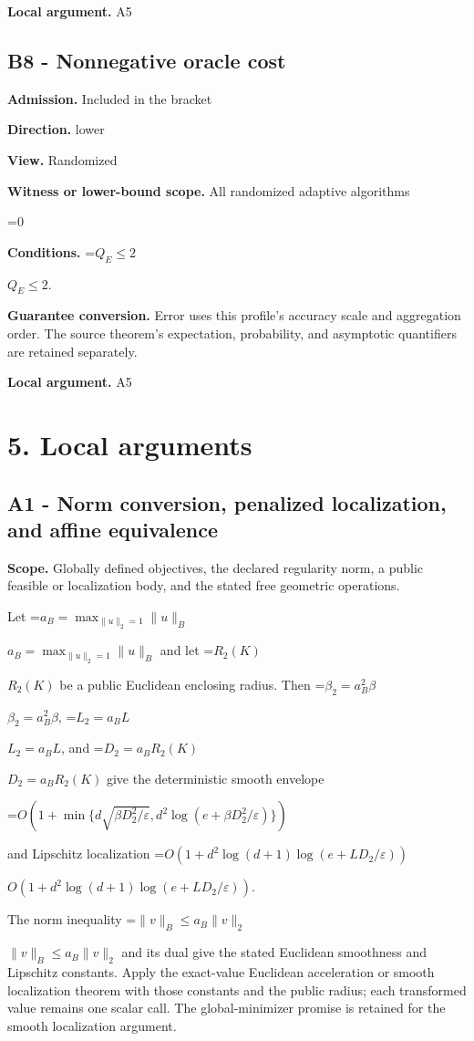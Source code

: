 \documentclass[10pt,a4paper]{article}
\newcommand{\AtlasMath}[1]{\par\begingroup\centering\setbox0=\hbox{$\displaystyle #1$}\ifdim\wd0>1.4\linewidth\typeout{ATLAS WIDE FORMULA: \the\wd0}\fi\ifdim\wd0>\linewidth\resizebox{\linewidth}{!}{\box0}\else\box0\fi\par\endgroup}
\newcommand{\AtlasInlineMath}[1]{\begingroup\setbox0=\hbox{$#1$}\ifdim\wd0>.4\linewidth\endgroup\AtlasMath{#1}\else\endgroup$#1$\fi}
\begin{document}
\textbf{Local argument.} A5

\subsection{B8 - Nonnegative oracle cost}
\textbf{Admission.} Included in the bracket

\textbf{Direction.} lower

\textbf{View.} Randomized

\textbf{Witness or lower-bound scope.} All randomized adaptive algorithms

\AtlasMath{0}
\textbf{Conditions.} \AtlasInlineMath{Q_E\le 2}.

\textbf{Guarantee conversion.} Error uses this profile's accuracy scale and aggregation order. The source theorem's expectation, probability, and asymptotic quantifiers are retained separately.

\textbf{Local argument.} A5

\section{5. Local arguments}
\subsection{A1 - Norm conversion, penalized localization, and affine equivalence}
\textbf{Scope.} Globally defined objectives, the declared regularity norm, a public feasible or localization body, and the stated free geometric operations.

Let \AtlasInlineMath{a_B=\max_{\|u\|_2=1}\|u\|_B} and let \AtlasInlineMath{R_2(K)} be a public Euclidean enclosing radius. Then \AtlasInlineMath{\beta_2=a_B^2\beta}, \AtlasInlineMath{L_2=a_BL}, and \AtlasInlineMath{D_2=a_BR_2(K)} give the deterministic smooth envelope

\AtlasMath{O\!\left(1+\min\{d\sqrt{\beta D_2^2/\varepsilon},d^2\log(e+\beta D_2^2/\varepsilon)\}\right)}

and Lipschitz localization \AtlasInlineMath{O(1+d^2\log(d+1)\log(e+LD_2/\varepsilon))}.

The norm inequality \AtlasInlineMath{\|v\|_B\le a_B\|v\|_2} and its dual give the stated Euclidean smoothness and Lipschitz constants. Apply the exact-value Euclidean acceleration or smooth localization theorem with those constants and the public radius; each transformed value remains one scalar call. The global-minimizer promise is retained for the smooth localization argument.
\end{document}
